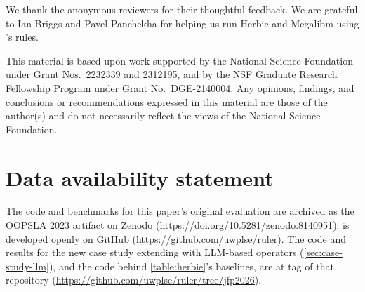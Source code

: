 \documentclass[review=false]{jfp-epi}
\theoremstyle{definition}
\begin{document}










\begin{acks}
  We thank the anonymous reviewers for their thoughtful feedback.
  We are grateful to Ian Briggs and Pavel Panchekha for helping us run
  Herbie and Megalibm using \enumo's rules.

  This material is based upon work supported by the National Science
  Foundation under Grant Nos.~2232339 and 2312195, and by the NSF
  Graduate Research Fellowship Program under Grant No.~DGE-2140004.
  Any opinions, findings, and conclusions or recommendations expressed
  in this material are those of the author(s) and do not necessarily
  reflect the views of the National Science Foundation.
\end{acks}

\section*{Data availability statement}
  The code and benchmarks for this paper's original evaluation are
  archived as the OOPSLA 2023 artifact on Zenodo
  (\url{https://doi.org/10.5281/zenodo.8140951}).
  \enumo{} is developed openly on GitHub
  (\url{https://github.com/uwplse/ruler}).
  The code and results for the new case study extending \enumo with
  LLM-based operators (\autoref{sec:case-study-llm}), and the code
  behind \autoref{table:herbie}'s baselines, are at tag 
  of that repository
  (\url{https://github.com/uwplse/ruler/tree/jfp2026}).


\end{document}
